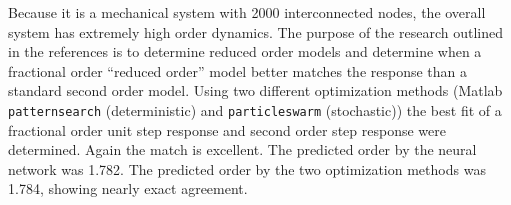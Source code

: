 Because it is a mechanical system with 2000 interconnected nodes, the overall
system has extremely high order dynamics. The purpose of the research outlined
in the references is to determine reduced order models and determine when a
fractional order ``reduced order'' model better matches the response than a
standard second order model. Using two different optimization methods (Matlab
\texttt{patternsearch} (deterministic) and \texttt{particleswarm} (stochastic))
the best fit of a fractional order unit step response and second order step
response were determined. Again the match is excellent.  The predicted order by
the neural network was 1.782. The predicted order by the two optimization
methods was 1.784, showing nearly exact agreement.

